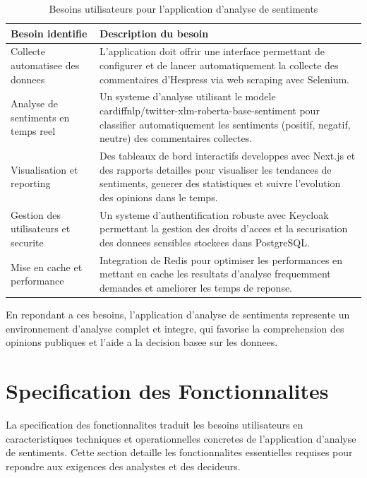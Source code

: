 \begin{table}[H]
\centering
\begin{tabularx}{\textwidth}{|l|X|}
\hline
\textbf{Besoin identifie} & \textbf{Description du besoin} \\
\hline
Collecte automatisee des donnees & 
L'application doit offrir une interface permettant de configurer et de lancer automatiquement la collecte des commentaires d'Hespress via web scraping avec Selenium. \\
\hline
Analyse de sentiments en temps reel & 
Un systeme d'analyse utilisant le modele cardiffnlp/twitter-xlm-roberta-base-sentiment pour classifier automatiquement les sentiments (positif, negatif, neutre) des commentaires collectes. \\
\hline
Visualisation et reporting & 
Des tableaux de bord interactifs developpes avec Next.js et des rapports detailles pour visualiser les tendances de sentiments, generer des statistiques et suivre l'evolution des opinions dans le temps. \\
\hline
Gestion des utilisateurs et securite & 
Un systeme d'authentification robuste avec Keycloak permettant la gestion des droits d'acces et la securisation des donnees sensibles stockees dans PostgreSQL. \\
\hline
Mise en cache et performance & 
Integration de Redis pour optimiser les performances en mettant en cache les resultats d'analyse frequemment demandes et ameliorer les temps de reponse. \\
\hline
\end{tabularx}
\caption{Besoins utilisateurs pour l'application d'analyse de sentiments}
\label{tab:besoins-utilisateurs}
\end{table}

En repondant a ces besoins, l'application d'analyse de sentiments represente un environnement d'analyse complet et integre, qui favorise la comprehension des opinions publiques et l'aide a la decision basee sur les donnees.

\section{Specification des Fonctionnalites}

La specification des fonctionnalites traduit les besoins utilisateurs en caracteristiques techniques et operationnelles concretes de l'application d'analyse de sentiments. Cette section detaille les fonctionnalites essentielles requises pour repondre aux exigences des analystes et des decideurs.

